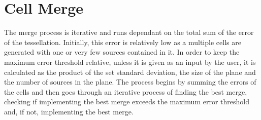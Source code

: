 \section{Cell Merge}

The merge process is iterative and runs dependant on the total sum of the error of the tessellation. Initially, this error is relatively low as a multiple cells are generated with one or very few sources contained in it. In order to keep the maximum error threshold relative, unless it is given as an input by the user, it is calculated as the product of the set standard deviation, the size of the plane and the number of sources in the plane. The process begins by summing the errors of the cells and then goes through an iterative process of finding the best merge, checking if implementing the best merge exceeds the maximum error threshold and, if not, implementing the best merge.

